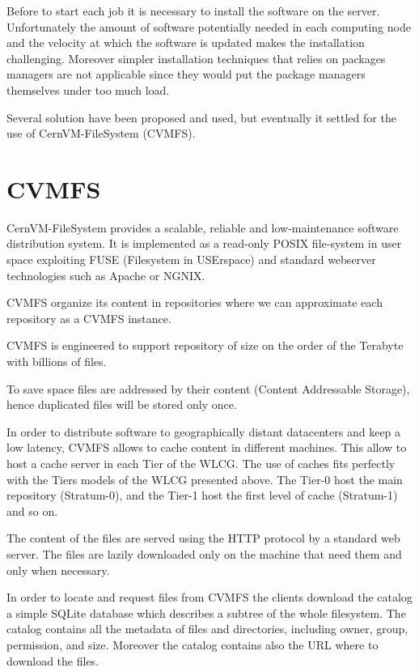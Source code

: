 Before to start each job it is necessary to install the software on the server.
Unfortunately the amount of software potentially needed in each computing node
and the velocity at which the software is updated makes the installation
challenging. Moreover simpler installation techniques that relies on packages
managers are not applicable since they would put the package managers
themselves under too much load.

Several solution have been proposed and used, but eventually it settled for the
use of CernVM-FileSystem (CVMFS).

\section{CVMFS}

CernVM-FileSystem provides a scalable, reliable and low-maintenance software
distribution system. It is implemented as a read-only POSIX file-system in user
space exploiting FUSE (Filesystem in USErspace) and standard webserver
technologies such as Apache or NGNIX.

CVMFS organize its content in repositories where we can approximate each
repository as a CVMFS instance.

CVMFS is engineered to support repository of size on the order of the Terabyte
with billions of files.

To save space files are addressed by their content (Content Addressable
Storage), hence duplicated files will be stored only once.

In order to distribute software to geographically distant datacenters and keep
a low latency, CVMFS allows to cache content in different machines. This allow
to host a cache server in each Tier of the WLCG. The use of caches fits
perfectly with the Tiers models of the WLCG presented above. The Tier-0 host
the main repository (Stratum-0), and the Tier-1 host the first level of cache
(Stratum-1) and so on.

The content of the files are served using the HTTP protocol by a standard
web server. The files are lazily downloaded only on the machine that need them
and only when necessary.

In order to locate and request files from CVMFS the clients download the
catalog a simple SQLite database which describes a subtree of the whole
filesystem.  The catalog contains all the metadata of files and directories,
including owner, group, permission, and size. Moreover the catalog contains
also the URL where to download the files.

